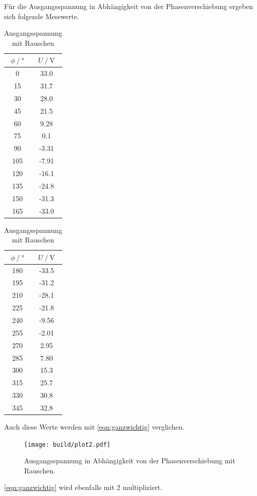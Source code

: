 Für die Ausgangsspannung in Abhängigkeit von der Phasenverschiebung ergeben sich folgende Messwerte.
\begin{table}
  \centering
  \caption{Ausgangsspannung mit Rauschen}
  \label{tab:ohne_Rauschen}
  \begin{subtable}{0.48\textwidth}
    \centering
  \begin{tabular}{cc}
    \toprule {$\phi \:/\: °$} & {$U \:/\: \si{\volt}$} \\
    \midrule
    0	& 33.0 \\
    15 & 31.7 \\
    30 & 28.0 \\
    45	& 21.5 \\
    60 & 9.28 \\
    75 & 0.1 \\
    90	& -3.31 \\
    105 & -7.91 \\
    120	& -16.1 \\
    135	& -24.8 \\
    150	& -31.3 \\
    165 & -33.0 \\
    \bottomrule
    \end{tabular}
  \end{subtable}
  \begin{subtable}{0.48\textwidth}
    \centering
  \begin{tabular}{cc}
    \toprule {$\phi \:/\: °$} & {$U \:/\: \si{\volt}$} \\
    \midrule
    180	& -33.5 \\
    195	& -31.2 \\
    210	& -28.1 \\
    225	& -21.8 \\
    240 & -9.56 \\
    255	& -2.01 \\
    270	& 2.95 \\
    285	& 7.80 \\
    300	& 15.3 \\
    315	& 25.7 \\
    330	& 30.8 \\
    345	& 32.8 \\
    \bottomrule
    \end{tabular}
  \end{subtable}
\end{table}

Auch diese Werte werden mit \ref{eqn:ganzwichtig} verglichen.
\begin{figure}
  \centering
  \texttt{[image: build/plot2.pdf]}
\caption{Ausgangsspannung in Abhängigkeit von der Phasenverschiebung mit Rauschen.}
  \label{fig:mit_rauschen}
\end{figure}
\ref{eqn:ganzwichtig} wird ebenfalls mit 2 multipliziert.

